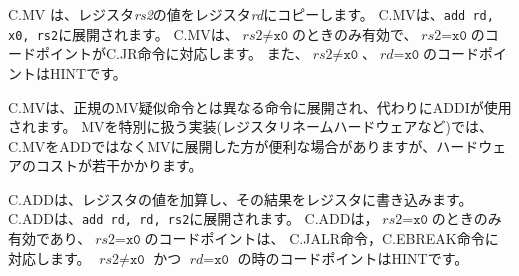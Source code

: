 \begin{comment}
C.MV copies the value in register {\em rs2} into register {\em rd}.  C.MV
expands into {\tt add rd, x0, rs2}.
C.MV is only valid when $\textit{rs2}{\neq}\texttt{x0}$; the code points
with $\textit{rs2}{=}\texttt{x0}$ correspond to the C.JR instruction.
The code points with $\textit{rs2}{\neq}\texttt{x0}$ and
$\textit{rd}{=}\texttt{x0}$ are HINTs.
\end{comment}
C.MV は、レジスタ{\em rs2}の値をレジスタ{\em rd}にコピーします。
C.MVは、{\tt add rd, x0, rs2}に展開されます。
C.MVは、$\textit{rs2}{\neq}\texttt{x0}$のときのみ有効で、$\textit{rs2}{=}\texttt{x0}$のコードポイントがC.JR命令に対応します。
また、$\textit{rs2}{\neq}\texttt{x0}$、$\textit{rd}{=}\texttt{x0}$のコードポイントはHINTです。

\begin{commentary}
\begin{comment}
C.MV expands to a different instruction than the canonical MV
pseudoinstruction, which instead uses ADDI. Implementations that handle MV
specially, e.g. using register-renaming hardware, may find it more convenient
to expand C.MV to MV instead of ADD, at slight additional hardware cost.
\end{comment}
C.MVは、正規のMV疑似命令とは異なる命令に展開され、代わりにADDIが使用されます。
MVを特別に扱う実装(レジスタリネームハードウェアなど)では、C.MVをADDではなくMVに展開した方が便利な場合がありますが、ハードウェアのコストが若干かかります。
\end{commentary}

\begin{comment}
C.ADD adds the values in registers {\em rd} and {\em rs2} and writes the
result to register {\em rd}.  C.ADD expands into {\tt add rd, rd, rs2}.
C.ADD is only valid when $\textit{rs2}{\neq}\texttt{x0}$; the code points
with $\textit{rs2}{=}\texttt{x0}$ correspond to the C.JALR and C.EBREAK instructions.
The code points with $\textit{rs2}{\neq}\texttt{x0}$ and
$\textit{rd}{=}\texttt{x0}$ are HINTs.
\end{comment}
C.ADDは、レジスタの値を加算し、その結果をレジスタに書き込みます。
C.ADDは、{\tt add rd, rd, rs2}に展開されます。
C.ADDは，$\textit{rs2}{=}\texttt{x0}$のときのみ有効であり、$\textit{rs2}{=}\texttt{x0}$のコードポイントは、
C.JALR命令，C.EBREAK命令に対応します。
$\textit{rs2}{\neq}\texttt{x0}$ かつ $\textit{rd}{=}\texttt{x0}$ の時のコードポイントはHINTです。

